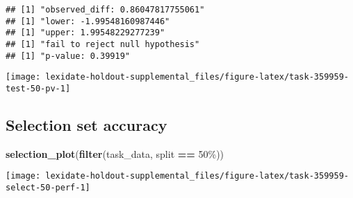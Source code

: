 \documentclass[
]{book}
\newenvironment{Shaded}{\begin{snugshade}}{\end{snugshade}}
\newcommand{\AttributeTok}[1]{\textcolor[rgb]{0.13,0.29,0.53}{#1}}
\newcommand{\DecValTok}[1]{\textcolor[rgb]{0.00,0.00,0.81}{#1}}
\newcommand{\FunctionTok}[1]{\textcolor[rgb]{0.13,0.29,0.53}{\textbf{#1}}}
\newcommand{\NormalTok}[1]{#1}
\newcommand{\OtherTok}[1]{\textcolor[rgb]{0.56,0.35,0.01}{#1}}
\newcommand{\SpecialCharTok}[1]{\textcolor[rgb]{0.81,0.36,0.00}{\textbf{#1}}}
\newcommand{\StringTok}[1]{\textcolor[rgb]{0.31,0.60,0.02}{#1}}
\begin{document}
\begin{Shaded}
\end{Shaded}

\begin{verbatim}
## [1] "observed_diff: 0.86047817755061"
## [1] "lower: -1.99548160987446"
## [1] "upper: 1.99548229277239"
## [1] "fail to reject null hypothesis"
## [1] "p-value: 0.39919"
\end{verbatim}

\texttt{[image: lexidate-holdout-supplemental\_files/figure-latex/task-359959-test-50-pv-1]}

\hypertarget{selection-set-accuracy-37}{%
\subsection{Selection set accuracy}\label{selection-set-accuracy-37}}

\begin{Shaded}
\begin{Highlighting}[]
\FunctionTok{selection\_plot}\NormalTok{(}\FunctionTok{filter}\NormalTok{(task\_data, split }\SpecialCharTok{==} \StringTok{\textquotesingle{}50\%\textquotesingle{}}\NormalTok{))}
\end{Highlighting}
\end{Shaded}

\texttt{[image: lexidate-holdout-supplemental\_files/figure-latex/task-359959-select-50-perf-1]}
\end{document}
